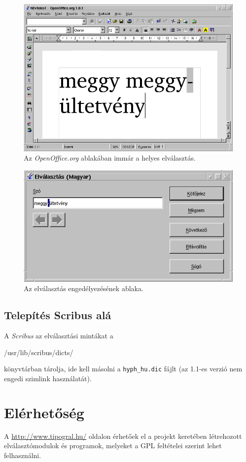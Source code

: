 \documentclass[12pt]{article}
\newenvironment{code}{%
  \begin{list}{}{\raggedright\normalfont\ttfamily}\item[]}
  {\end{list}
}
\begin{document}
\begin{figure}
\begin{centering}
\includegraphics[scale=0.5]{oo1}
\end{centering}
\caption{Az \emph{OpenOffice.org} ablakában immár a helyes elválasztás.}
\end{figure}


\begin{figure}
\begin{centering}
\includegraphics[scale=0.5]{oo2}
\end{centering}
\caption{Az elválasztás engedélyezésének ablaka.}
\end{figure}


\subsection{Telepítés Scribus alá}

A \emph{Scribus} az elválasztási mintákat a

\begin{code}
/usr/lib/scribus/dicts/
\end{code}

könyvtárban tárolja, ide kell másolni a \texttt{hyph\_hu.dic} fájlt
(az 1.1-es verzió nem engedi szimlink használatát).


\section{Elérhetőség}

A \url{http://www.tipogral.hu/} oldalon érhetőek el a projekt keretében
létrehozott elválasztómodulok és programok, melyeket a GPL
feltételei szerint lehet felhasználni.
\end{document}
